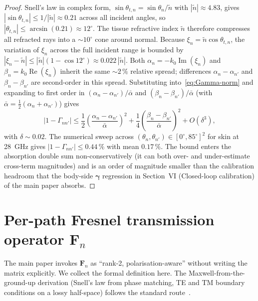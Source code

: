 \documentclass[10pt,journal,twocolumn]{IEEEtran}
\newcommand{\Fn}{\mathbf{F}_n}
\newcommand{\gammab}{\bm{\gamma}}
\newcommand{\ntilde}{\tilde{n}}
\DeclareMathOperator{\RE}{Re}
\DeclareMathOperator{\IM}{Im}
\theoremstyle{plain}
\theoremstyle{definition}
\begin{document}
\begin{proof}
Snell's law in complex form, $\sin\theta_{t,n} = \sin\theta_n/\ntilde$
with $|\ntilde| \approx 4.83$, gives
$|\sin\theta_{t,n}| \leq 1/|\ntilde| \approx 0.21$ across all
incident angles, so $|\theta_{t,n}| \leq \arcsin(0.21) \approx
12^{\circ}$. The tissue refractive index $\ntilde$ therefore
compresses all refracted rays into a $\sim\!10^{\circ}$ cone around
normal. Because $\xi_n = \ntilde \cos\theta_{t,n}$, the variation
of $\xi_n$ across the full incident range is bounded by
$|\xi_n - \ntilde| \leq |\ntilde|(1 - \cos 12^{\circ}) \approx
0.022\,|\ntilde|$. Both $\alpha_n = -k_0 \IM(\xi_n)$ and
$\beta_n = k_0 \RE(\xi_n)$ inherit the same $\sim\!2\,\%$ relative
spread; differences $\alpha_n - \alpha_{n'}$ and $\beta_n - \beta_{n'}$
are second-order in this spread. Substituting into~\eqref{eq:Gamma-norm}
and expanding to first order in
$(\alpha_n - \alpha_{n'})/\bar\alpha$ and
$(\beta_n - \beta_{n'})/\bar\alpha$ (with
$\bar\alpha = \tfrac{1}{2}(\alpha_n + \alpha_{n'})$) gives
\begin{equation}
  |1 - \Gamma_{nn'}|
    \leq \frac{1}{2}
    \left(\frac{\alpha_n - \alpha_{n'}}{\bar\alpha}\right)^2
    + \frac{1}{4}
    \left(\frac{\beta_n - \beta_{n'}}{\bar\alpha}\right)^2
    + O(\delta^3),
\end{equation}
with $\delta \sim 0.02$. The numerical sweep
across $(\theta_n, \theta_{n'}) \in [0^{\circ}, 85^{\circ}]^2$ for
skin at 28~GHz gives
$|1 - \Gamma_{nn'}| \leq 0.44\,\%$ with mean $0.17\,\%$. The bound
enters the
absorption double sum non-conservatively (it can both over- and
under-estimate cross-term magnitudes) and is an order of magnitude
smaller than the calibration headroom that the body-side $\gammab$
regression in Section~VI (Closed-loop calibration) of the main paper absorbs.
\end{proof}

\section{Per-path Fresnel transmission operator $\mathbf{F}_n$}\label{si:Fn}

The main paper invokes $\Fn$ as ``rank-2, polarisation-aware''
without writing the matrix explicitly. We collect the formal
definition here. The Maxwell-from-the-ground-up derivation (Snell's
law from phase matching, TE and TM boundary conditions on a lossy
half-space) follows the standard route~\cite{BornWolf}.
\end{document}
